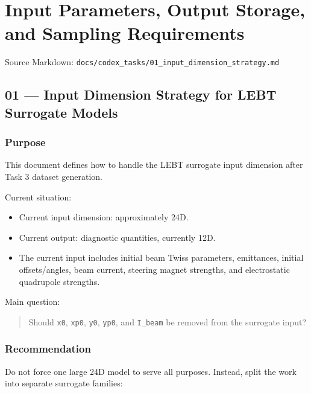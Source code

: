 \documentclass[
]{article}
\providecommand{\tightlist}{%
  \setlength{\itemsep}{0pt}\setlength{\parskip}{0pt}}
\begin{document}
\hypertarget{input-parameters-output-storage-and-sampling-requirements}{%
\section{Input Parameters, Output Storage, and Sampling
Requirements}\label{input-parameters-output-storage-and-sampling-requirements}}

Source Markdown:
\texttt{docs/codex\_tasks/01\_input\_dimension\_strategy.md}

\hypertarget{input-dimension-strategy-for-lebt-surrogate-models}{%
\subsection{01 --- Input Dimension Strategy for LEBT Surrogate
Models}\label{input-dimension-strategy-for-lebt-surrogate-models}}

\hypertarget{purpose-1}{%
\subsubsection{Purpose}\label{purpose-1}}

This document defines how to handle the LEBT surrogate input dimension
after Task 3 dataset generation.

Current situation:

\begin{itemize}
\tightlist
\item
  Current input dimension: approximately 24D.
\item
  Current output: diagnostic quantities, currently 12D.
\item
  The current input includes initial beam Twiss parameters, emittances,
  initial offsets/angles, beam current, steering magnet strengths, and
  electrostatic quadrupole strengths.
\end{itemize}

Main question:

\begin{quote}
Should \texttt{x0}, \texttt{xp0}, \texttt{y0}, \texttt{yp0}, and
\texttt{I\_beam} be removed from the surrogate input?
\end{quote}

\hypertarget{recommendation}{%
\subsubsection{Recommendation}\label{recommendation}}

Do not force one large 24D model to serve all purposes. Instead, split
the work into separate surrogate families:
\end{document}
